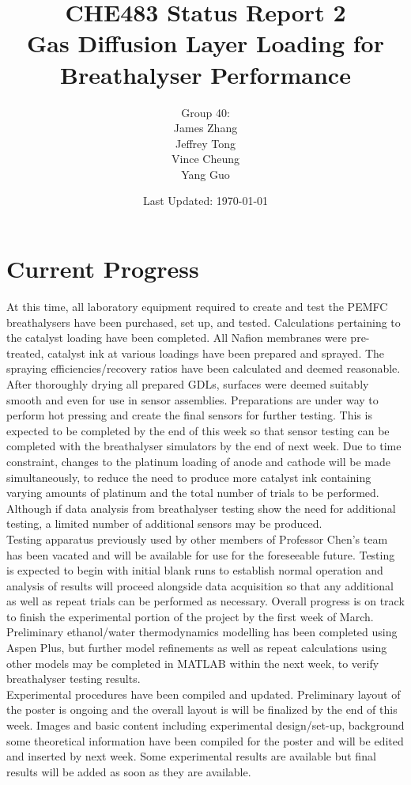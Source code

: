 \documentclass{article}
\begin{document}
	\title{CHE483 Status Report 2 \\ Gas Diffusion Layer Loading for Breathalyser Performance}
	\author{Group 40: \\James Zhang \\ Jeffrey Tong \\ Vince Cheung \\ Yang Guo }
	\date{Last Updated: \today}
	\maketitle
	\cleardoublepage
		\tableofcontents
\pagebreak
	\section{Current Progress}
	At this time, all laboratory equipment required to create and test the PEMFC breathalysers have been purchased, set up, and tested. Calculations pertaining to the catalyst loading have been completed. All Nafion membranes were pre-treated, catalyst ink at various loadings have been prepared and sprayed. The spraying efficiencies/recovery ratios have been calculated and deemed reasonable. After thoroughly drying all prepared GDLs, surfaces were deemed suitably smooth and even for use in sensor assemblies. Preparations are under way to perform hot pressing and create the final sensors for further testing. This is expected to be completed by the end of this week so that sensor testing can be completed with the breathalyser simulators by the end of next week. Due to time constraint, changes to the platinum loading of anode and cathode will be made simultaneously, to reduce the need to produce more catalyst ink containing varying amounts of platinum and the total number of trials to be performed. Although if data analysis from breathalyser testing show the need for additional testing, a limited number of additional sensors may be produced. \\
	Testing apparatus previously used by other members of Professor Chen's team has been vacated and will be available for use for the foreseeable future. Testing is expected to begin with initial blank runs to establish normal operation and analysis of results will proceed alongside data acquisition so that any additional as well as repeat trials can be performed as necessary. Overall progress is on track to finish the experimental portion of the project by the first week of March.\\
	Preliminary ethanol/water thermodynamics modelling has been completed using Aspen Plus, but further model refinements as well as repeat calculations using other models may be completed in MATLAB within the next week, to verify breathalyser testing results.\\
	Experimental procedures have been compiled and updated. Preliminary layout of the poster is ongoing and the overall layout is will be finalized by the end of this week. Images and basic content including experimental design/set-up, background some theoretical information have been compiled for the poster and will be edited and inserted by next week. Some experimental results are available but final results will be added as soon as they are available.
\pagebreak
\end{document}
